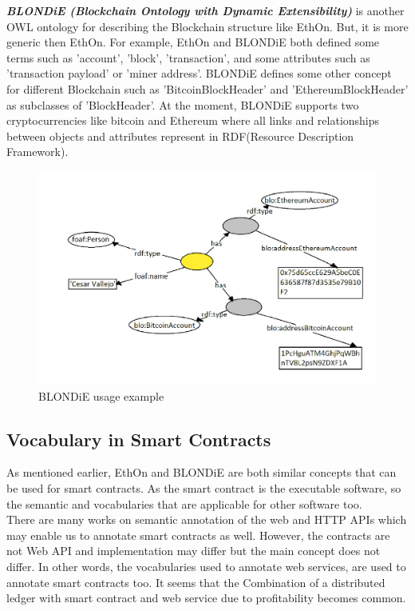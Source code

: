 \textbf{\textit{BLONDiE (Blockchain Ontology with Dynamic Extensibility)}} is another OWL ontology for describing the
Blockchain structure like EthOn. But, it is more generic then EthOn. For example, EthOn and BLONDiE both defined some terms such as 'account', 'block', 'transaction', and some attributes such as 'transaction payload' or 'miner address'. BLONDiE defines some other concept for different Blockchain such as 'BitcoinBlockHeader' and 'EthereumBlockHeader' as subclasses of 'BlockHeader'. At the moment, BLONDiE supports two cryptocurrencies like bitcoin and Ethereum where all links and relationships between objects and attributes represent in RDF(Resource Description Framework)\cite{Third}.
\begin{center}
	\begin{figure}[htb!]
		
		\begin{minipage}{0.55\linewidth}
			\centering
			\includegraphics[width=1.75\textwidth]{images/chap02_BLONDiE.png}
		\end{minipage}
		\caption[BLONDiE]{BLONDiE usage example\cite{Hector}}
		
		
	\end{figure}
	
\end{center}
\subsection{Vocabulary in Smart Contracts}
As mentioned earlier, EthOn and BLONDiE are both similar concepts that can be used for smart contracts. As the smart contract is the executable software, so the semantic and vocabularies that are applicable for other software too.\\
There are many works on semantic annotation of the web and HTTP APIs which may enable us to annotate smart contracts as well. However, the contracts are not Web API and implementation may differ but the main concept does not differ. In other words, the vocabularies used to annotate web services, are used to annotate smart contracts too. It seems that the Combination of a distributed ledger with smart contract and web service due to profitability becomes common\cite{Third}.


